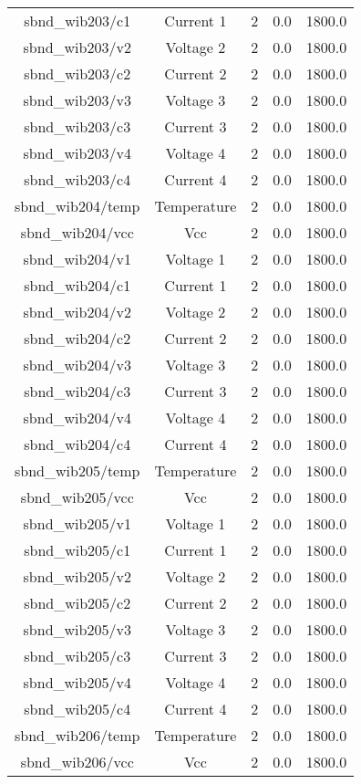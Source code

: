 \begin{center}
\begin{longtable}{c | c c c c }
sbnd\_wib203/c1 & Current 1 & 2 & 0.0 & 1800.0\\ 
sbnd\_wib203/v2 & Voltage 2 & 2 & 0.0 & 1800.0\\ 
sbnd\_wib203/c2 & Current 2 & 2 & 0.0 & 1800.0\\ 
sbnd\_wib203/v3 & Voltage 3 & 2 & 0.0 & 1800.0\\ 
sbnd\_wib203/c3 & Current 3 & 2 & 0.0 & 1800.0\\ 
sbnd\_wib203/v4 & Voltage 4 & 2 & 0.0 & 1800.0\\ 
sbnd\_wib203/c4 & Current 4 & 2 & 0.0 & 1800.0\\ 
sbnd\_wib204/temp & Temperature & 2 & 0.0 & 1800.0\\ 
sbnd\_wib204/vcc & Vcc & 2 & 0.0 & 1800.0\\ 
sbnd\_wib204/v1 & Voltage 1 & 2 & 0.0 & 1800.0\\ 
sbnd\_wib204/c1 & Current 1 & 2 & 0.0 & 1800.0\\ 
sbnd\_wib204/v2 & Voltage 2 & 2 & 0.0 & 1800.0\\ 
sbnd\_wib204/c2 & Current 2 & 2 & 0.0 & 1800.0\\ 
sbnd\_wib204/v3 & Voltage 3 & 2 & 0.0 & 1800.0\\ 
sbnd\_wib204/c3 & Current 3 & 2 & 0.0 & 1800.0\\ 
sbnd\_wib204/v4 & Voltage 4 & 2 & 0.0 & 1800.0\\ 
sbnd\_wib204/c4 & Current 4 & 2 & 0.0 & 1800.0\\ 
sbnd\_wib205/temp & Temperature & 2 & 0.0 & 1800.0\\ 
sbnd\_wib205/vcc & Vcc & 2 & 0.0 & 1800.0\\ 
sbnd\_wib205/v1 & Voltage 1 & 2 & 0.0 & 1800.0\\ 
sbnd\_wib205/c1 & Current 1 & 2 & 0.0 & 1800.0\\ 
sbnd\_wib205/v2 & Voltage 2 & 2 & 0.0 & 1800.0\\ 
sbnd\_wib205/c2 & Current 2 & 2 & 0.0 & 1800.0\\ 
sbnd\_wib205/v3 & Voltage 3 & 2 & 0.0 & 1800.0\\ 
sbnd\_wib205/c3 & Current 3 & 2 & 0.0 & 1800.0\\ 
sbnd\_wib205/v4 & Voltage 4 & 2 & 0.0 & 1800.0\\ 
sbnd\_wib205/c4 & Current 4 & 2 & 0.0 & 1800.0\\ 
sbnd\_wib206/temp & Temperature & 2 & 0.0 & 1800.0\\ 
sbnd\_wib206/vcc & Vcc & 2 & 0.0 & 1800.0\\ 

\end{longtable}
\end{center}
